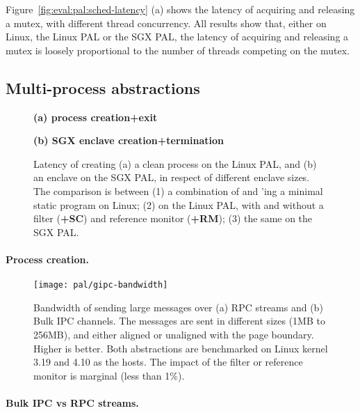 Figure~\ref{fig:eval:pal:sched-latency} (a) shows the latency of acquiring and releasing a mutex,
with different thread concurrency.
All results show that, either on Linux, the Linux PAL or the SGX PAL, the latency of acquiring and releasing a mutex
is loosely proportional to the number of threads competing on the mutex.




\subsection{Multi-process abstractions}
\label{sec:eval:pal:multi-proc}

\begin{figure*}[t!]
\centering
\footnotesize
{}
\parbox{0.59\textwidth}{\centering\bf (a) process creation+exit}
\parbox{0.39\textwidth}{\centering\bf (b) SGX enclave creation+termination}
\caption{Latency of creating (a) a clean process on the Linux PAL, and (b) an enclave on the SGX PAL, in respect of different enclave sizes.
The comparison is between (1) a combination of  and 'ing a minimal static program on Linux; (2)  on the Linux PAL, with and without a \seccomp{} filter ({\bf +SC}) and reference monitor ({\bf +RM}); (3) the same \hostapi{} on the SGX PAL.}
\label{fig:eval:pal:proc-latency}
\end{figure*}

\paragraph{Process creation.}




\begin{figure*}[t!]
\centering
\footnotesize
\texttt{[image: pal/gipc-bandwidth]}
\caption{Bandwidth of sending large messages over (a) RPC streams and (b) Bulk IPC channels. The messages are sent in different sizes (1MB to 256MB), and either aligned or unaligned with the page boundary.
Higher is better. Both abstractions are benchmarked on Linux kernel 3.19 and 4.10 as the hosts. The impact of the \seccomp{} filter or reference monitor is marginal (less than 1\%).}
\label{fig:eval:pal:gipc-bandwidth}
\end{figure*}


\paragraph{Bulk IPC vs RPC streams.}




